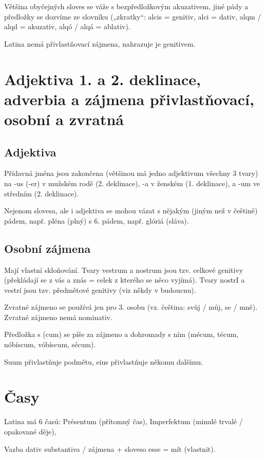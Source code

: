 \documentclass[12pt]{article}					%
\begin{document}
        Většina obyčejných sloves se váže s bezpředložkovým akuzativem, jiné pády a předložky se dozvíme ze slovníku („zkratky“: alcis = genitiv, alci = dativ, alqm / alqd = akuzativ, alqó / alqá = ablativ).

        Latina nemá přivlastňovací zájmena, nahrazuje je genitivem.

\section{Adjektiva 1. a 2. deklinace, adverbia a zájmena přivlastňovací, osobní a zvratná}
    \subsection{Adjektiva}
        Přídavná jména jsou zakončena (většinou má jedno adjektivum všechny 3 tvary) na -us (-er) v mužském rodě (2. deklinace), -a v ženském (1. deklinace), a -um ve středním (2. deklinace).


        Nejenom slovesa, ale i adjektiva se mohou vázat s nějakým (jiným než v češtině) pádem, např. pléna (plný) s 6. pádem, např. glóriá (sláva).

    \subsection{Osobní zájmena}
    Mají vlastní skloňování. Tvary vestrum a nostrum jsou tzv. celkové genitivy (překládají se z vás a znás = celek z kterého se něco vyjímá). Tvary nostrI a vestrí jsou tzv. předmětové genitivy (viz někdy v budoucnu).

    Zvratné zájmeno se používá jen pro 3. osobu (vz. čeština: svůj / můj, se / mně). Zvratné zájmeno nemá nominativ.

    Předložka s (cum) se píše za zájmeno a dohromady s ním (mécum, técum, nóbíscum, vóbíscum, sécum).

    Suum přivlastňuje podmětu, eius přivlastňuje někomu dalšímu.


\section{Časy}
    Latina má 6 časů: Présentum (přítomný čas), Imperfektum (minulé trvalé / opakované děje), 


    Vazba dativ substantiva / zájmena + sloveso esse = mít (vlastnit).
\end{document}

